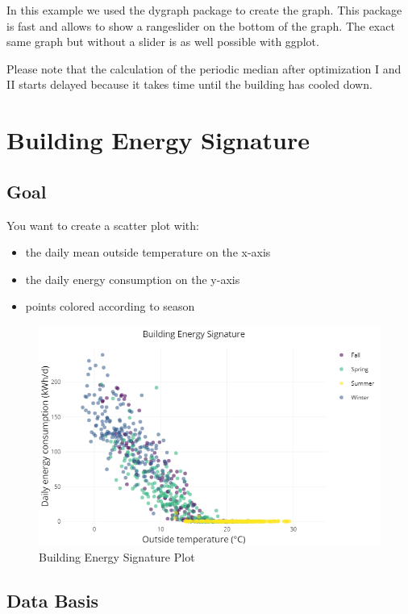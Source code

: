 \documentclass[
  a4paperpaper,
]{book}
\begin{document}
In this example we used the dygraph package to create the graph. This package is fast and allows to show a rangeslider on the bottom of the graph. The exact same graph but without a slider is as well possible with ggplot.

Please note that the calculation of the periodic median after optimization I and II starts delayed because it takes time until the building has cooled down.

\newpage

\hypertarget{building-energy-signature}{%
\section{Building Energy Signature}\label{building-energy-signature}}

\hypertarget{goal-23}{%
\subsection{Goal}\label{goal-23}}

You want to create a scatter plot with:

\begin{itemize}
\item
  the daily mean outside temperature on the x-axis
\item
  the daily energy consumption on the y-axis
\item
  points colored according to season
\end{itemize}

\begin{figure}
\includegraphics[width=0.7\linewidth]{images/plotBldgEngySigScatter} \caption{Building Energy Signature Plot}\label{fig:unnamed-chunk-34}
\end{figure}

\hypertarget{data-basis-23}{%
\subsection{Data Basis}\label{data-basis-23}}
\end{document}
